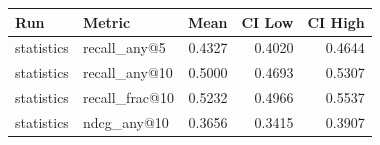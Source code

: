 \begin{tabular}{llrrr}
\toprule
Run & Metric & Mean & CI Low & CI High \\
\midrule
statistics & recall\_any@5 & 0.4327 & 0.4020 & 0.4644 \\
statistics & recall\_any@10 & 0.5000 & 0.4693 & 0.5307 \\
statistics & recall\_frac@10 & 0.5232 & 0.4966 & 0.5537 \\
statistics & ndcg\_any@10 & 0.3656 & 0.3415 & 0.3907 \\
\bottomrule
\end{tabular}
